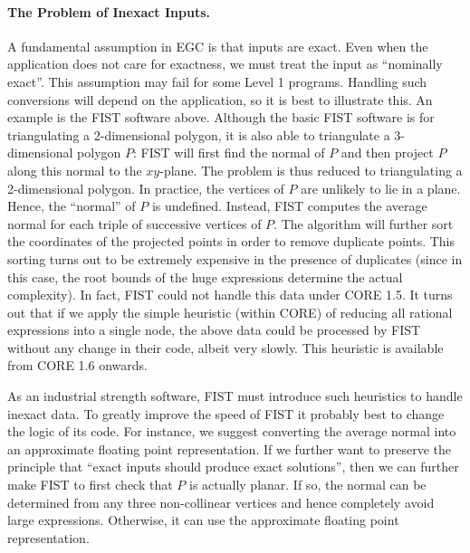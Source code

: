 \documentclass[12pt]{article}
\begin{document}
\begin{itemize}

\end{itemize}

\paragraph{The Problem of Inexact Inputs.}
A fundamental assumption in EGC is that inputs
are exact.  Even when the application does not care for exactness,
we must treat the input as ``nominally exact''.  This assumption
may fail for some Level 1 programs.  Handling such conversions
will depend on the application, so it is best to illustrate this.
An example is the FIST software above.   Although the basic FIST software
is for triangulating a 2-dimensional polygon, it is also able
to triangulate a 3-dimensional polygon $P$:
FIST will first find the normal of $P$ and then
project $P$ along this normal to the $xy$-plane.  
The problem is thus reduced
to triangulating a 2-dimensional polygon.  In practice, 
the vertices of $P$ are unlikely to lie in a plane.  Hence, the
``normal'' of $P$ is undefined.  Instead, FIST computes the average normal for
each triple of successive vertices of $P$.  
The algorithm will further sort the coordinates
of the projected points in order to remove duplicate points.  This
sorting turns out to be extremely expensive in the presence of
duplicates (since in this case, the root bounds of the huge expressions
determine the actual complexity). 
In fact, FIST could not handle this data under CORE 1.5.
It turns out that if we apply the simple
heuristic (within CORE) of reducing all rational expressions
into a single node, the above data could be processed by FIST without
any change in their code, albeit very slowly.  
This heuristic is available from CORE 1.6 onwards.

As an industrial strength software,
FIST must introduce such heuristics to handle inexact data.
To greatly improve the speed of FIST it probably best to change
the logic of its code.  For instance, we suggest converting
the average normal into an approximate floating point representation.
If we further want to preserve the principle that ``exact inputs should produce
exact solutions'', then we can further make FIST to first check that $P$ is
actually planar.  If so, the normal can be determined from
any three non-collinear vertices and hence completely avoid large expressions.
Otherwise, it can use the approximate floating point representation.
\end{document}
